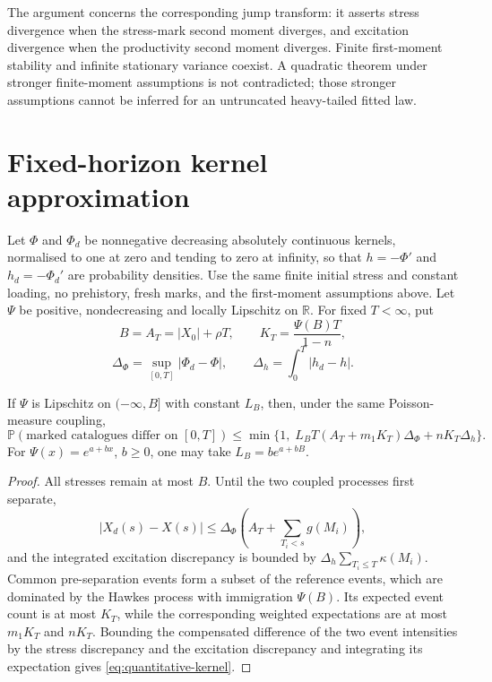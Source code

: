 The argument concerns the corresponding jump transform: it asserts stress divergence when the stress-mark second moment diverges, and excitation divergence when the productivity second moment diverges. Finite first-moment stability and infinite stationary variance coexist. A quadratic theorem under stronger finite-moment assumptions is not contradicted; those stronger assumptions cannot be inferred for an untruncated heavy-tailed fitted law.

\section{Fixed-horizon kernel approximation}

Let \(\Phi\) and \(\Phi_d\) be nonnegative decreasing absolutely continuous kernels, normalised to one at zero and tending to zero at infinity, so that \(h=-\Phi'\) and \(h_d=-\Phi_d'\) are probability densities. Use the same finite initial stress and constant loading, no prehistory, fresh marks, and the first-moment assumptions above. Let \(\Psi\) be positive, nondecreasing and locally Lipschitz on \(\mathbb R\). For fixed \(T<\infty\), put
\[
B=A_T=|X_0|+\rho T,\qquad
K_T=\frac{\Psi(B)T}{1-n},
\]
\[
\Delta_\Phi=\sup_{[0,T]}|\Phi_d-\Phi|,
\qquad
\Delta_h=\int_0^T|h_d-h|.
\]

\begin{proposition}\label{prop:quantitative-kernel}
If \(\Psi\) is Lipschitz on \((-\infty,B]\) with constant \(L_B\), then, under the same Poisson-measure coupling,
\begin{equation}\label{eq:quantitative-kernel}
\mathbb P(\text{marked catalogues differ on }[0,T])
\leq\min\{1,\;L_BT(A_T+m_1K_T)\Delta_\Phi+nK_T\Delta_h\}.
\end{equation}
For \(\Psi(x)=e^{a+bx}\), \(b\geq0\), one may take \(L_B=be^{a+bB}\).
\end{proposition}

\begin{proof}
All stresses remain at most \(B\). Until the two coupled processes first separate,
\[
|X_d(s)-X(s)|
\leq\Delta_\Phi\left(A_T+\sum_{T_i<s}g(M_i)\right),
\]
and the integrated excitation discrepancy is bounded by
\(\Delta_h\sum_{T_i\leq T}\kappa(M_i)\). Common pre-separation events form a subset of the reference events, which are dominated by the Hawkes process with immigration \(\Psi(B)\). Its expected event count is at most \(K_T\), while the corresponding weighted expectations are at most \(m_1K_T\) and \(nK_T\). Bounding the compensated difference of the two event intensities by the stress discrepancy and the excitation discrepancy and integrating its expectation gives \eqref{eq:quantitative-kernel}.
\end{proof}

